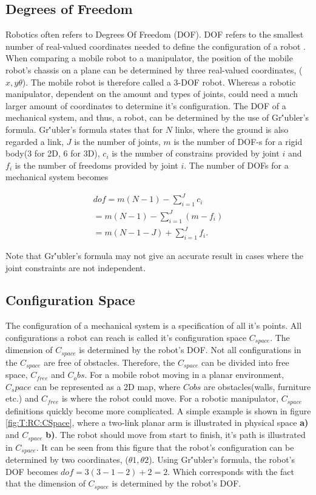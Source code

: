 \subsection{Degrees of Freedom}
Robotics often refers to Degrees Of Freedom (DOF). DOF refers to the smallest number of real-valued coordinates needed to define the configuration of a robot \cite{LynchKevin2017Mr:m}. When comparing a mobile robot to a manipulator, the position of the mobile robot's chassis on a plane can be determined by three real-valued coordinates, ($x,y\theta$). The mobile robot is therefore called a 3-DOF robot. Whereas a robotic manipulator, dependent on the amount and types of joints, could need a much larger amount of coordinates to determine it's configuration. The DOF of a mechanical system, and thus, a robot, can be determined by the use of Gr\''{u}bler's formula.  Gr\''{u}bler's formula states that for $N$ links, where the ground is also regarded a link, $J$ is the number of joints, $m$ is the number of DOF-s for a rigid body(3 for 2D, 6 for 3D), $c_i$ is the number of constrains  provided by joint $i$ and $f_i$ is the number of freedoms provided by joint $i$. The number of DOFs for a mechanical system becomes

\begin{align}
\label{ec:DOFs}
    dof = m(N-1) -  \sum_{i=1}^{J} c_i \\
    = m(N-1) - \sum_{i=1}^{J}(m-f_i) \\
    = m(N-1-J) + \sum_{i=1}^{J}f_i.
\end{align}

Note that Gr\''ubler's formula may not give an accurate result in cases where the joint constraints are not independent\cite{LynchKevin2017Mr:m}.

\subsection{Configuration Space}
The configuration of a mechanical system is a specification of all it's points\cite{LynchKevin2017Mr:m}. All configurations a robot can reach is called it's configuration space $C_{space}$. The dimension of $C_{space}$ is determined by the robot's DOF. Not all configurations in the $C_{space}$ are free of obstacles. Therefore, the $C_{space}$ can be divided into free space, $C_{free}$ and $C_obs$. For a mobile robot moving in a planar environment, $C_space$ can be represented as a 2D map, where $C{obs}$ are obstacles(walls, furniture etc.) and $C_{free}$ is where the robot could move. For a robotic manipulator, $C_{space}$ definitions quickly become more complicated. A simple example is shown in figure \ref{fig:T:RC:CSpace}, where a two-link planar arm is illustrated in physical space \textbf{a)} and $C_{space}$ \textbf{b)}. The robot should move from start to finish, it's path is illustrated in $C_{space}$. It can be seen from this figure that the robot's configuration can be determined by two coordinates, ($\theta1, \theta2$). Using Gr\''ubler's formula, the robot's DOF becomes $dof=3(3-1-2)+2=2$. Which corresponds with the fact that the dimension of $C_{space}$ is determined by the robot's DOF.

